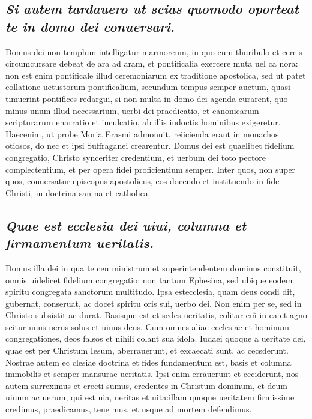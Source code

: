 \documentclass{article}
\begin{document}
\begin{pages}
\subsection*{\textit{Si autem tardauero ut scias quomodo oporteat te in domo dei conuersari. }}\pstart Domus dei non templum intelligatur marmoreum, in quo cum thuribulo et cereis circumcursare debeat de ara ad aram, et pontificalia exercere muta uel ca nora: non est enim pontificale illud ceremoniarum ex traditione apostolica, sed ut patet collatione uetustorum pontificalium, secundum tempus semper auctum, quasi timuerint pontifices redargui, si non multa in domo dei agenda curarent, quo minus unum illud necessarium, uerbi dei praedicatio, et canonicarum scripturarum enarratio et inculcatio, ab illis indoctis hominibus exigeretur. Haecenim, ut probe Moria Erasmi admonuit, reiicienda erant in monachos otiosos, do nec et ipsi Suffraganei crearentur. Domus dei est quaelibet fidelium congregatio, Christo synceriter credentium, et uerbum dei toto pectore complectentium, et per opera fidei proficientium semper. Inter quos, non super quos, conuersatur episcopus apostolicus, eos docendo et instituendo in fide Christi, in doctrina san na et catholica.  \pend
{}
{}
\subsection*{\textit{Quae est ecclesia dei uiui, columna et firmamentum ueritatis. }}\pstart Domus illa dei in qua te ceu ministrum et superintendentem dominus constituit, omnis uidelicet fidelium congregatio: non tantum Ephesina, sed ubique eodem spiritu congregata sanctorum multitudo. Ipsa estecclesia, quam deus condi dit, gubernat, conseruat, ac docet spiritu oris sui, uerbo dei. Non enim per se, sed in Christo subsistit ac durat. Basisque est et sedes ueritatis, colitur em̃ in ea et agno scitur unus uerus solus et uiuus deus. Cum omnes aliae ecclesiae et hominum congregationes, deos falsos et nihili colant sua idola. Iudaei quoque a ueritate dei, quae est per Christum Iesum, aberrauerunt, et excaecati sunt, ac cecsderunt. Nostrae autem ec clesiae doctrina et fides fundamentum est, basis et columna immobilis et semper mansurae ueritatis. Ipsi enim errauerunt et ceciderunt, nos autem surreximus et erecti sumus, credentes in Christum dominum, et deum uiuum ac uerum, qui est uia, ueritas et uita:illam quoque ueritatem firmissime credimus, praedicamus, tene mus, et usque ad mortem defendimus.  \pend
{}
{}

\end{pages}
\end{document}
